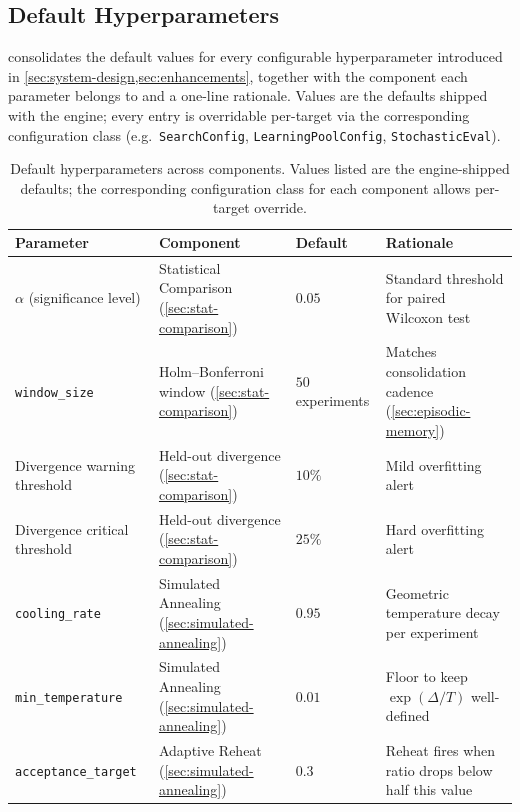 \subsection{Default Hyperparameters}\label{sec:hyperparameters}

 consolidates the default values for every configurable hyperparameter introduced in \cref{sec:system-design,sec:enhancements}, together with the component each parameter belongs to and a one-line rationale.
Values are the defaults shipped with the engine; every entry is overridable per-target via the corresponding configuration class (e.g.\ \texttt{SearchConfig}, \texttt{LearningPoolConfig}, \texttt{StochasticEval}).

\begin{table}[t]
\centering
\caption{Default hyperparameters across components. Values listed are the engine-shipped defaults; the corresponding configuration class for each component allows per-target override.}
\label{tab:hyperparameters}
\footnotesize
\begin{tabular}{@{}p{4.0cm}p{4.0cm}p{2.6cm}p{5.0cm}@{}}
\toprule
\textbf{Parameter} & \textbf{Component} & \textbf{Default} & \textbf{Rationale} \\
\midrule
$\alpha$ (significance level)         & Statistical Comparison (\cref{sec:stat-comparison}) & $0.05$ & Standard threshold for paired Wilcoxon test \\
\texttt{window\_size}                 & Holm--Bonferroni window (\cref{sec:stat-comparison}) & $50$ experiments & Matches consolidation cadence (\cref{sec:episodic-memory}) \\
Divergence warning threshold          & Held-out divergence (\cref{sec:stat-comparison}) & $10\%$ & Mild overfitting alert \\
Divergence critical threshold         & Held-out divergence (\cref{sec:stat-comparison}) & $25\%$ & Hard overfitting alert \\
\texttt{cooling\_rate}                & Simulated Annealing (\cref{sec:simulated-annealing}) & $0.95$ & Geometric temperature decay per experiment \\
\texttt{min\_temperature}             & Simulated Annealing (\cref{sec:simulated-annealing}) & $0.01$ & Floor to keep $\exp(\Delta/T)$ well-defined \\
\texttt{acceptance\_target}           & Adaptive Reheat (\cref{sec:simulated-annealing}) & $0.3$ & Reheat fires when ratio drops below half this value \\

\end{tabular}
\end{table}
